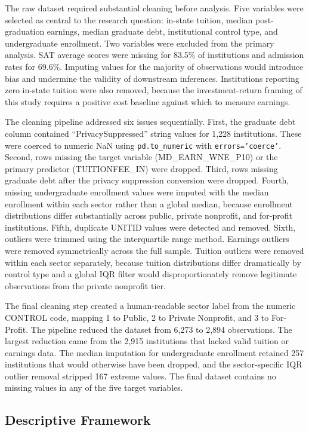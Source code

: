 The raw dataset required substantial cleaning before analysis. Five variables were selected as central to the research question: in-state tuition, median post-graduation earnings, median graduate debt, institutional control type, and undergraduate enrollment. Two variables were excluded from the primary analysis. SAT average scores were missing for 83.5\% of institutions and admission rates for 69.6\%. Imputing values for the majority of observations would introduce bias and undermine the validity of downstream inferences. Institutions reporting zero in-state tuition were also removed, because the investment-return framing of this study requires a positive cost baseline against which to measure earnings.

The cleaning pipeline addressed six issues sequentially. First, the graduate debt column contained ``PrivacySuppressed'' string values for 1,228 institutions. These were coerced to numeric NaN using \texttt{pd.to\_numeric} with \texttt{errors='coerce'}. Second, rows missing the target variable (MD\_EARN\_WNE\_P10) or the primary predictor (TUITIONFEE\_IN) were dropped. Third, rows missing graduate debt after the privacy suppression conversion were dropped. Fourth, missing undergraduate enrollment values were imputed with the median enrollment within each sector rather than a global median, because enrollment distributions differ substantially across public, private nonprofit, and for-profit institutions. Fifth, duplicate UNITID values were detected and removed. Sixth, outliers were trimmed using the interquartile range method. Earnings outliers were removed symmetrically across the full sample. Tuition outliers were removed within each sector separately, because tuition distributions differ dramatically by control type and a global IQR filter would disproportionately remove legitimate observations from the private nonprofit tier.

The final cleaning step created a human-readable sector label from the numeric CONTROL code, mapping 1 to Public, 2 to Private Nonprofit, and 3 to For-Profit. The pipeline reduced the dataset from 6,273 to 2,894 observations. The largest reduction came from the 2,915 institutions that lacked valid tuition or earnings data. The median imputation for undergraduate enrollment retained 257 institutions that would otherwise have been dropped, and the sector-specific IQR outlier removal stripped 167 extreme values. The final dataset contains no missing values in any of the five target variables.

\subsection{Descriptive Framework}

